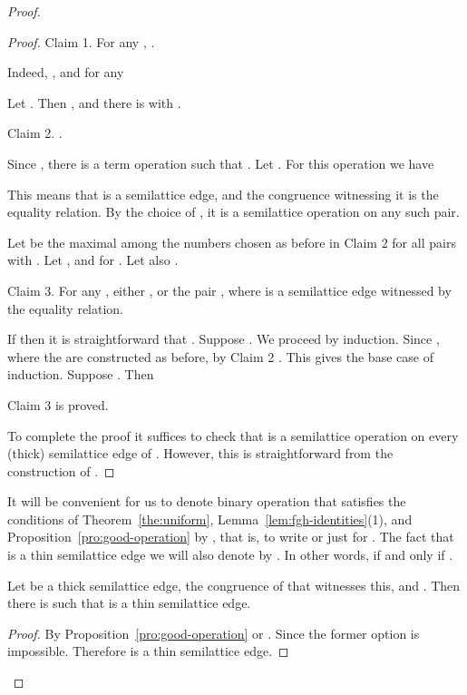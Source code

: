 \documentclass[11pt]{article}
\begin{document}
\begin{proof}
\begin{proof}
{\sc Claim 1.} 
For any , .

\smallskip

Indeed, , and for any 


Let . Then , and there is 
with .

\medskip

{\sc Claim 2.}
.

\smallskip

Since , there is a term operation
 such that . Let . For this operation we have


This means that  is a semilattice edge, and the congruence witnessing
it is the equality relation. By the choice of , it is a
semilattice operation on any such pair.

Let  be the maximal among the numbers chosen as before
in Claim 2 for all pairs  with . Let ,
and  for . Let also
.

\medskip

{\sc Claim 3.} For any , either , or the
pair , where  is a semilattice edge witnessed by the
equality relation.

\smallskip

If  then it is straightforward that .
Suppose . We proceed by induction. Since
, where the  are constructed as before,
by Claim 2 . This gives the base case
of induction. Suppose . Then

Claim 3 is proved.

\smallskip

To complete the proof it suffices to check that  is a
semilattice operation on every (thick) semilattice edge of .
However, this is straightforward from the construction of
.
\end{proof}

It will be convenient for us to denote binary operation  that satisfies the 
conditions of Theorem~\ref{the:uniform}, Lemma~\ref{lem:fgh-identities}(1),
and Proposition~\ref{pro:good-operation} by , that is, to write 
or just  for . The fact that  is a thin semilattice edge we will
also denote by . In other words,  if and only if .

\begin{lemma}\label{lem:sl-thick-thin}
Let  be a thick semilattice edge,  the congruence of  that witnesses 
this, and . Then there is  such that  is a thin semilattice 
edge.
\end{lemma}

\begin{proof}
By Proposition~\ref{pro:good-operation}  or . Since  
the former option is impossible. Therefore  is a thin semilattice edge.
\end{proof}



\end{proof}
\end{document}
